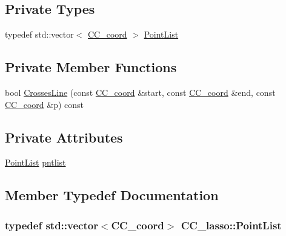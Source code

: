 \subsection*{Private Types}
\begin{DoxyCompactItemize}
\item 
typedef std\-::vector$<$ \hyperlink{a00029}{C\-C\-\_\-coord} $>$ \hyperlink{a00033_a6c1ecccf9e723b7179aaf286dd7ba715}{Point\-List}
\end{DoxyCompactItemize}
\subsection*{Private Member Functions}
\begin{DoxyCompactItemize}
\item 
bool \hyperlink{a00033_a54ad0a354040f6d9f4a12b7e355f45f9}{Crosses\-Line} (const \hyperlink{a00029}{C\-C\-\_\-coord} \&start, const \hyperlink{a00029}{C\-C\-\_\-coord} \&end, const \hyperlink{a00029}{C\-C\-\_\-coord} \&p) const 
\end{DoxyCompactItemize}
\subsection*{Private Attributes}
\begin{DoxyCompactItemize}
\item 
\hyperlink{a00033_a6c1ecccf9e723b7179aaf286dd7ba715}{Point\-List} \hyperlink{a00033_aa2fba003c26aa52be0c935482a86ce5b}{pntlist}
\end{DoxyCompactItemize}


\subsection{Member Typedef Documentation}
\hypertarget{a00033_a6c1ecccf9e723b7179aaf286dd7ba715}{
\subsubsection[{Point\-List}]{\setlength{\rightskip}{0pt plus 5cm}typedef std\-::vector$<${\bf C\-C\-\_\-coord}$>$ {\bf C\-C\-\_\-lasso\-::\-Point\-List}\hspace{0.3cm}{\ttfamily [private]}}}\label{a00033_a6c1ecccf9e723b7179aaf286dd7ba715}


